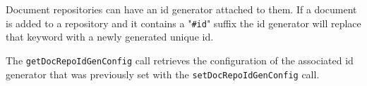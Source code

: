 Document repositories can have an id generator attached to them. If a document is added to
a repository and it contains a "\verb+#id+" suffix the id generator will replace that keyword with
a newly generated unique id.

The \verb+getDocRepoIdGenConfig+ call retrieves the configuration of the associated id generator
that was previously set with the \verb+setDocRepoIdGenConfig+ call.
